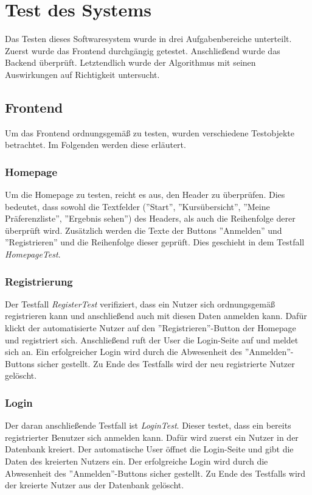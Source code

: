 \chapter{Test des Systems}
\label{chapter:testing}

	Das Testen dieses Softwaresystem wurde in drei Aufgabenbereiche unterteilt.
	Zuerst wurde das Frontend durchgängig getestet.
	Anschließend wurde das Backend überprüft.
	Letztendlich wurde der Algorithmus mit seinen Auswirkungen auf Richtigkeit untersucht.
	
	\section{Frontend}
		Um das Frontend ordnungsgemäß zu testen, wurden verschiedene Testobjekte betrachtet.
		Im Folgenden werden diese erläutert.
		
		\subsection{Homepage}
		Um die Homepage zu testen, reicht es aus, den Header zu überprüfen.
		Dies bedeutet, dass sowohl die Textfelder (''Start'', ''Kursübersicht'', ''Meine Präferenzliste'', ''Ergebnis sehen'') des Headers, als auch die Reihenfolge derer überprüft wird.
		Zusätzlich werden die Texte der Buttons ''Anmelden'' und ''Registrieren'' und die Reihenfolge dieser geprüft.
		Dies geschieht in dem Testfall \textit{HomepageTest}.\newline
		
		\subsection{Registrierung}
		Der Testfall \textit{RegisterTest} verifiziert, dass ein Nutzer sich ordnungsgemäß registrieren kann und anschließend auch mit diesen Daten anmelden kann.
		Dafür klickt der automatisierte Nutzer auf den ''Registrieren''-Button der Homepage und registriert sich.
		Anschließend ruft der User die Login-Seite auf und meldet sich an.
		Ein erfolgreicher Login wird durch die Abwesenheit des ''Anmelden''-Buttons sicher gestellt.
		Zu Ende des Testfalls wird der neu registrierte Nutzer gelöscht.\newline
		
		\subsection{Login}
		Der daran anschließende Testfall ist \textit{LoginTest}.
		Dieser testet, dass ein bereits registrierter Benutzer sich anmelden kann.
		Dafür wird zuerst ein Nutzer in der Datenbank kreiert.
		Der automatische User öffnet die Login-Seite und gibt die Daten des kreierten Nutzers ein.
		Der erfolgreiche Login wird durch die Abwesenheit des ''Anmelden''-Buttons sicher gestellt.
		Zu Ende des Testfalls wird der kreierte Nutzer aus der Datenbank gelöscht.\newline
		
